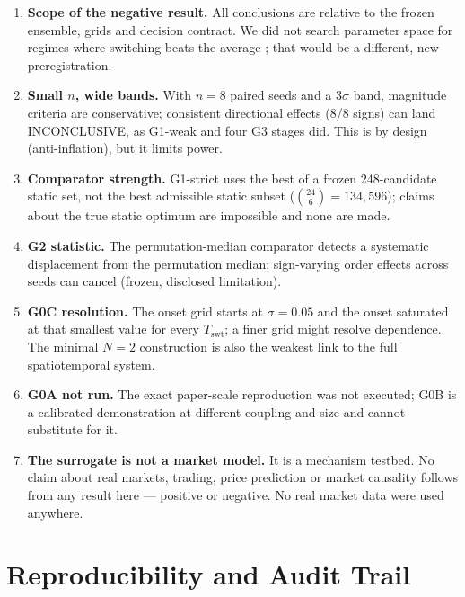 \documentclass[11pt]{article}
\newcommand{\Tswt}{T_{\mathrm{swt}}}
\begin{document}
\begin{enumerate}
  \item \textbf{Scope of the negative result.} All conclusions are relative to
  the frozen ensemble, grids and decision contract. We did not search
  parameter space for regimes where switching beats the average
  \citep{zhang2021designing}; that would be a different, new preregistration.
  \item \textbf{Small $n$, wide bands.} With $n=8$ paired seeds and a
  $3\hat{\sigma}$ band, magnitude criteria are conservative; consistent
  directional effects (8/8 signs) can land INCONCLUSIVE, as G1-weak and four
  G3 stages did. This is by design (anti-inflation), but it limits power.
  \item \textbf{Comparator strength.} G1-strict uses the best of a frozen
  248-candidate static set, not the best admissible static subset
  ($\binom{24}{6}=134{,}596$); claims about the true static optimum are
  impossible and none are made.
  \item \textbf{G2 statistic.} The permutation-median comparator detects a
  systematic displacement from the permutation median; sign-varying order
  effects across seeds can cancel (frozen, disclosed limitation).
  \item \textbf{G0C resolution.} The onset grid starts at $\sigma=0.05$ and
  the onset saturated at that smallest value for every $\Tswt$; a finer grid
  might resolve dependence. The minimal $N=2$ construction is also the
  weakest link to the full spatiotemporal system.
  \item \textbf{G0A not run.} The exact paper-scale reproduction was not
  executed; G0B is a calibrated demonstration at different coupling and size
  and cannot substitute for it.
  \item \textbf{The surrogate is not a market model.} It is a mechanism
  testbed. No claim about real markets, trading, price prediction or market
  causality follows from any result here --- positive or negative. No real
  market data were used anywhere.
\end{enumerate}

\section{Reproducibility and Audit Trail}
\label{sec:repro}
\end{document}
